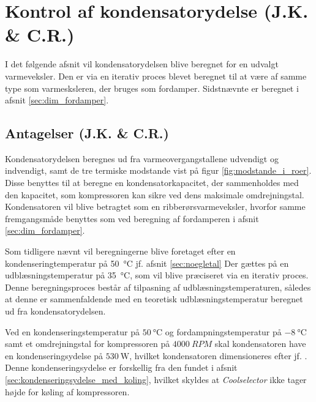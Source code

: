 \documentclass[../Hovedrapport.tex]{subfiles}
\begin{document}
\section{Kontrol af kondensatorydelse (J.K. \& C.R.)}
    \label{sec:dim_kondensator}
I det følgende afsnit vil kondensatorydelsen blive beregnet for en udvalgt varmeveksler. Den er via en iterativ proces blevet beregnet til at være af samme type som varmesksleren, der bruges som fordamper. Sidstnævnte er beregnet i afsnit \ref{sec:dim_fordamper}.

\subsection{Antagelser  (J.K. \& C.R.)}
Kondensatorydelsen beregnes ud fra varmeovergangstallene udvendigt og indvendigt, samt de tre termiske modstande vist på figur \ref{fig:modstande_i_roer}. Disse benyttes til at beregne en kondensatorkapacitet, der sammenholdes med den kapacitet, som kompressoren kan sikre ved dens maksimale omdrejningstal. Kondensatoren vil blive betragtet som en ribberørsvarmeveksler, hvorfor samme fremgangsmåde benyttes som ved beregning af fordamperen i afsnit \ref{sec:dim_fordamper}.

Som tidligere nævnt vil beregningerne blive foretaget efter en kondenseringtemperatur på \SI{50}{\celsius} jf. afsnit \ref{sec:noegletal}
Der gættes på en udblæsningstemperatur på \SI{35}{\celsius}, som vil blive præciseret via en iterativ proces. Denne beregningsproces består af tilpasning af udblæsningstemperaturen, således at denne er sammenfaldende med en teoretisk udblæsningstemperatur beregnet ud fra kondensatorydelsen. 

Ved en kondenseringstemperatur på $\SI{50}{\celsius}$ og fordampningstemperatur på $\SI{-8}{\celsius}$ samt et omdrejningstal for kompressoren på $\SI{4000}{RPM}$ skal kondensatoren have en kondenseringsydelse på $\SI{530}{\watt}$, hvilket kondensatoren dimensioneres efter jf. \citep{Coolselector}. Denne kondenseringsydelse er forskellig fra den fundet i afsnit \ref{sec:kondenseringsydelse_med_koling}, hvilket skyldes at \textit{Coolselector} ikke tager højde for køling af kompressoren.
\end{document}
